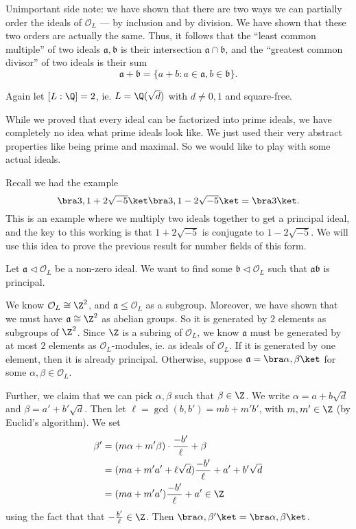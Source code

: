 \documentclass[a4paper]{article}
\begin{document}
Unimportant side note: we have shown that there are two ways we can partially order the ideals of $\mathcal{O}_L$ --- by inclusion and by division. We have shown that these two orders are actually the same. Thus, it follows that the ``least common multiple'' of two ideals $\mathfrak{a}, \mathfrak{b}$ is their intersection $\mathfrak{a} \cap \mathfrak{b}$, and the ``greatest common divisor'' of two ideals is their sum
\[
  \mathfrak{a} + \mathfrak{b} = \{a + b: a \in \mathfrak{a}, b \in \mathfrak{b}\}.
\]

\begin{eg}
  Again let $[L:\Q] = 2$, ie. $L = \Q(\sqrt{d})$ with $d \not= 0, 1$ and square-free.

  While we proved that every ideal can be factorized into prime ideals, we have completely no idea what prime ideals look like. We just used their very abstract properties like being prime and maximal. So we would like to play with some actual ideals.

  Recall we had the example
  \[
    \bra 3, 1 + 2\sqrt{-5}\ket \bra 3, 1 - 2\sqrt{-5}\ket = \bra 3\ket.
  \]
  This is an example where we multiply two ideals together to get a principal ideal, and the key to this working is that $1 + 2\sqrt{-5}$ is conjugate to $1 - 2\sqrt{-5}$. We will use this idea to prove the previous result for number fields of this form.

  Let $\mathfrak{a} \lhd \mathcal{O}_L$ be a non-zero ideal. We want to find some $\mathfrak{b} \lhd \mathcal{O}_L$ such that $\mathfrak{a}\mathfrak{b}$ is principal.

  We know $\mathcal{O}_L \cong \Z^2$, and $\mathfrak{a} \leq \mathcal{O}_L$ as a subgroup. Moreover, we have shown that we must have $\mathfrak{a} \cong \Z^2$ as abelian groups. So it is generated by $2$ elements as subgroups of $\Z^2$. Since $\Z$ is a subring of $\mathcal{O}_L$, we know $\mathfrak{a}$ must be generated by at most $2$ elements as $\mathcal{O}_L$-modules, ie. as ideals of $\mathcal{O}_L$. If it is generated by one element, then it is already principal. Otherwise, suppose $\mathfrak{a} = \bra \alpha, \beta\ket$ for some $\alpha, \beta \in \mathcal{O}_L$.

  Further, we claim that we can pick $\alpha, \beta$ such that $\beta \in \Z$. We write $\alpha = a + b \sqrt{d}$ and $\beta = a' + b' \sqrt{d}$. Then let $\ell = \gcd(b, b') = mb + m' b'$, with $m, m' \in \Z$ (by Euclid's algorithm). We set
  \begin{align*}
    \beta' &= (m\alpha + m' \beta)\cdot \frac{-b'}{\ell} + \beta\\
    &= (ma + m' a' + \ell \sqrt{d}) \frac{-b'}{\ell} + a' + b'\sqrt{d}\\
    &= (ma + m'a') \frac{-b'}{\ell} + a' \in \Z
  \end{align*}
  using the fact that that $-\frac{b'}{\ell} \in \Z$. Then $\bra \alpha, \beta'\ket = \bra \alpha, \beta\ket$.


\end{eg}
\end{document}
